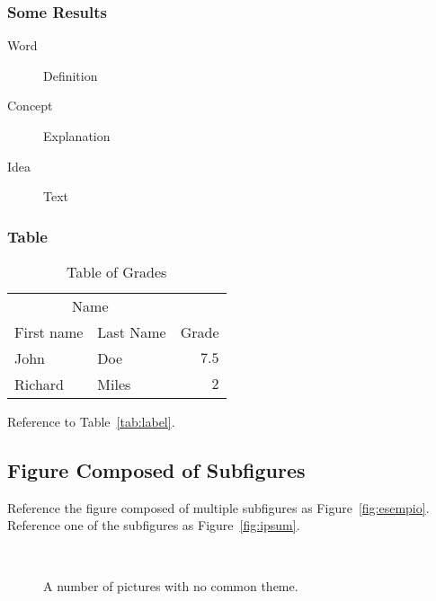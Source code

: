 \documentclass[12pt]{article} 				%
\begin{document}
\lipsum[11]

\subsubsection{Some Results} \label{subsubsection:some-results}
\lipsum[12] 

\begin{description}
\item[Word] Definition
\item[Concept] Explanation
\item[Idea] Text
\end{description}

\lipsum[12] 

\subsubsection{Table} \label{subsubsection:table}
\lipsum[13] 

\begin{table}[hbt]
\caption{Table of Grades}
\centering
\begin{tabular}{llr}
\toprule
\multicolumn{2}{c}{Name} \\
\cmidrule(r){1-2}
First name & Last Name & Grade \\
\midrule
John & Doe & $7.5$ \\
Richard & Miles & $2$ \\
\bottomrule
\end{tabular}
\label{tab:label}
\end{table}

Reference to Table~\vref{tab:label}. %

\subsection{Figure Composed of Subfigures} \label{subsection:compound}
Reference the figure composed of multiple subfigures as Figure~\vref{fig:esempio}. Reference one of the subfigures as Figure~\vref{fig:ipsum}. 

\lipsum[15-18]

\begin{figure}[tb]
\centering
{} \quad
{} \\
 \quad
{}
\caption[A number of pictures.]{A number of pictures with no common theme.}
\label{fig:esempio}
\end{figure}


				



	 
\end{document}
